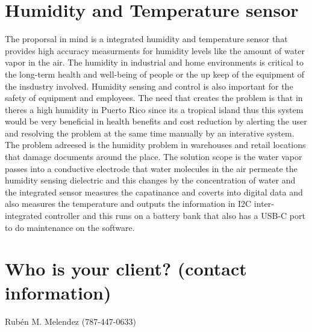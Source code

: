 \documentclass[12pt]{report}
\begin{document}
\section {Humidity and Temperature sensor}

The proporsal in mind is a integrated humidity and temperature sensor that provides high accuracy measurments for humidity levels like the amount of water vapor in the air. The humidity in industrial and home environments is critical to the long-term health and well-being of people or the up keep of the equipment of the insdustry involved. Humidity sensing and control is also important for the safety of equipment and employees. The need that creates the problem is that in theres a high humidity in Puerto Rico since its a tropical island thus this system would be very beneficial in health benefits and cost reduction by alerting the user and resolving the problem at the same time manually by an interative system. The problem adreesed is the humidity problem in warehouses and retail locations that damage documents around the place. The solution scope is the water vapor passes into a conductive electrode that water molecules in the air permeate the humidity sensing dielectric and this changes by the concentration of water and the integrated sensor measures the capatinance and coverts into digital data and also measures the temperature and outputs the information in I2C inter-integrated controller and this runs on a battery bank that also has a USB-C port to do maintenance on the software.  

\newpage
\section {Who is your client? (contact information)}
Rubén M. Melendez (787-447-0633)
\end{document}
